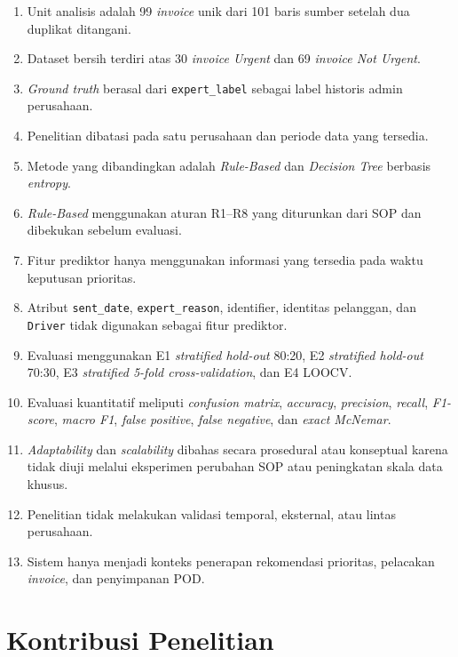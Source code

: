 \begin{enumerate}
    \item Unit analisis adalah 99 \textit{invoice} unik dari 101 baris sumber setelah dua duplikat ditangani.
    \item Dataset bersih terdiri atas 30 \textit{invoice Urgent} dan 69 \textit{invoice Not Urgent}.
    \item \textit{Ground truth} berasal dari \texttt{expert\_label} sebagai label historis admin perusahaan.
    \item Penelitian dibatasi pada satu perusahaan dan periode data yang tersedia.
    \item Metode yang dibandingkan adalah \textit{Rule-Based} dan \textit{Decision Tree} berbasis \textit{entropy}.
    \item \textit{Rule-Based} menggunakan aturan R1--R8 yang diturunkan dari SOP dan dibekukan sebelum evaluasi.
    \item Fitur prediktor hanya menggunakan informasi yang tersedia pada waktu keputusan prioritas.
    \item Atribut \texttt{sent\_date}, \texttt{expert\_reason}, identifier, identitas pelanggan, dan \texttt{Driver} tidak digunakan sebagai fitur prediktor.
    \item Evaluasi menggunakan E1 \textit{stratified hold-out} 80:20, E2 \textit{stratified hold-out} 70:30, E3 \textit{stratified 5-fold cross-validation}, dan E4 LOOCV.
    \item Evaluasi kuantitatif meliputi \textit{confusion matrix}, \textit{accuracy}, \textit{precision}, \textit{recall}, \textit{F1-score}, \textit{macro F1}, \textit{false positive}, \textit{false negative}, dan \textit{exact McNemar}.
    \item \textit{Adaptability} dan \textit{scalability} dibahas secara prosedural atau konseptual karena tidak diuji melalui eksperimen perubahan SOP atau peningkatan skala data khusus.
    \item Penelitian tidak melakukan validasi temporal, eksternal, atau lintas perusahaan.
    \item Sistem hanya menjadi konteks penerapan rekomendasi prioritas, pelacakan \textit{invoice}, dan penyimpanan POD.
\end{enumerate}

\section{Kontribusi Penelitian}

